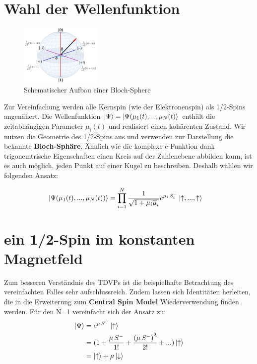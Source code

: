 \section{Wahl der Wellenfunktion}
\begin{figure}
    \centering
    \includegraphics[width = 0.35\textwidth]{Abbildungen/bloch-sphere.png}
    \caption{Schematischer Aufbau einer Bloch-Sphere}
    \label{fig:qubit}
\end{figure}
Zur Vereinfachung werden alle Kernspin (wie der Elektronenspin) als 1/2-Spins angenähert. 
Die Wellenfunktion $\ket{\Psi}=\ket{\Psi(\mu_1(t),...,\mu_N(t)}$ enthält die zeitabhängigen Parameter $\mu_i(t)$ und realisiert einen 
kohärenten Zustand. Wir nutzen die Geometrie des 1/2-Spins aus und verwenden zur Darstellung die bekannte \textbf{Bloch-Sphäre}. 
Ähnlich wie die komplexe e-Funktion dank trigonemtrische Eigenschaften einen Kreis auf der Zahlenebene abbilden kann, ist es auch möglich,
 jeden Punkt auf einer Kugel zu beschreiben. Deshalb wählen wir folgenden Ansatz:

\begin{align}
    \ket{\Psi(\mu_1(t),...,\mu_N(t))} &= \prod_{i=1}^{N} \frac{1}{\sqrt{1+\mu_i\overline{\mu}_i}}e^{\mu_i\thinspace S_i^-}\ket{\uparrow,...,\uparrow}
\end{align}

\section{ein 1/2-Spin im konstanten Magnetfeld}
Zum besseren Verständnis des TDVPs ist die beispielhafte Betrachtung des vereinfachten Falles sehr aufschlussreich. 
Zudem lassen sich Identitäten herleiten, die in die Erweiterung zum \textbf{Central Spin Model} Wiederverwendung finden werden.
Für den N=1 vereinfacht sich der Ansatz zu:
\begin{align*}
    \ket{\Psi} &= e^{\mu\thinspace S^-}\ket{\uparrow} \\
            &= (1 + \frac{\mu\thinspace S^{-}}{1!} + \frac{\left(\mu\thinspace S^{-}\right)^2}{2!} + ...)\ket{\uparrow}    \\
            &= \ket{\uparrow} + \mu\ket{\downarrow}
\end{align*}

